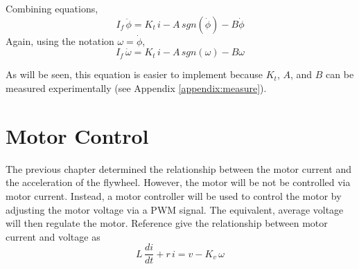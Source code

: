 \documentclass[12pt,letterpaper]{article}
\begin{document}

Combining equations,
%
\begin{equation}
    I_{f} \, \ddot{\phi}  = K_{t} \, i - A \, sgn(\dot{\phi} ) - B \dot{\phi}
\end{equation}
%
Again, using the notation $\omega = \dot{\phi}$,
%
\begin{equation}
    I_{f} \, \dot{\omega}  = K_{t} \, i - A \, sgn(\omega) - B \omega \label{wheel}
\end{equation}
%

As will be seen, this equation is easier to implement because $K_{t}$, $A$, and $B$ can be measured experimentally (see Appendix \ref{appendix:measure}).  







\section{Motor Control}
The previous chapter determined the relationship between the motor current and the acceleration of the flywheel.  
However, the motor will be not be controlled via motor current.  Instead, a motor controller will be used to control the 
motor by adjusting the motor voltage via a PWM signal.  The equivalent, average voltage will then regulate the motor.  
Reference \cite{monograph} give the relationship between motor current and voltage as
%
\begin{equation}
    L\, \frac{di}{dt} + r \,i = v - K_{v} \, \omega
\end{equation}
%

\end{document}
